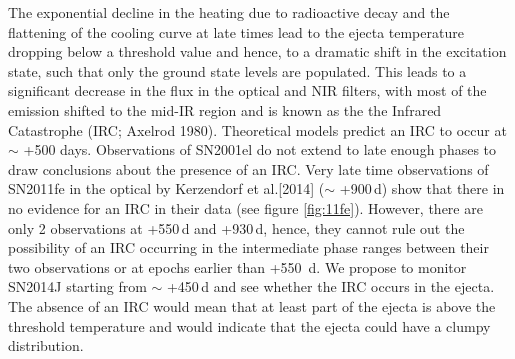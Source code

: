 \documentclass[11pt]{article}
\begin{document}
{The exponential decline in the heating due to radioactive decay and the flattening of the cooling curve at late times lead to the ejecta temperature dropping below a threshold value and hence, to a dramatic shift in the excitation state, such that only the ground state levels are populated. This leads to a significant decrease in the flux in the optical and NIR filters, with most of the emission shifted to the mid-IR region and is known as the the Infrared Catastrophe (IRC; Axelrod 1980). Theoretical models   predict an IRC to occur at $\sim$ +500 days. Observations of SN2001el do not extend to late enough phases to draw conclusions about the presence of an IRC. Very late time observations of SN2011fe in the optical by Kerzendorf et al.[2014] ($\sim$ +900\,d) show that there in no evidence for an IRC in their data (see figure \ref{fig:11fe}). However, there are only 2 observations at +550\,d and +930\,d, hence, they cannot rule out the possibility of an IRC occurring in the intermediate phase ranges between their two observations or at epochs earlier than +550 \,d. We propose to monitor SN2014J starting from $\sim$ +450\,d and see whether the IRC occurs in the ejecta. The absence of an IRC would mean that at least part of the ejecta is above the threshold temperature and would indicate that the ejecta could have a clumpy distribution.
 


}
\end{document}
